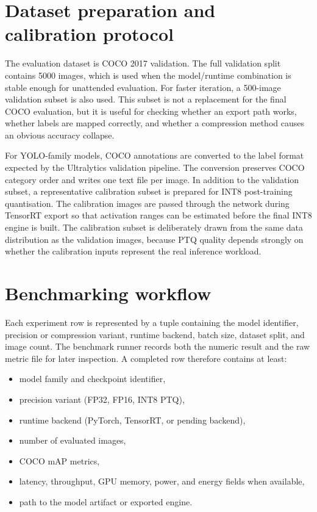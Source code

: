 \documentclass[a4paper,11pt,twoside]{report}
\theoremstyle{definition}
\begin{document}
\section{Dataset preparation and calibration protocol}

The evaluation dataset is COCO 2017 validation. The full validation split contains 5000 images, which is used when the model/runtime combination is stable enough for unattended evaluation. For faster iteration, a 500-image validation subset is also used. This subset is not a replacement for the final COCO evaluation, but it is useful for checking whether an export path works, whether labels are mapped correctly, and whether a compression method causes an obvious accuracy collapse.

For YOLO-family models, COCO annotations are converted to the label format expected by the Ultralytics validation pipeline. The conversion preserves COCO category order and writes one text file per image. In addition to the validation subset, a representative calibration subset is prepared for INT8 post-training quantisation. The calibration images are passed through the network during TensorRT export so that activation ranges can be estimated before the final INT8 engine is built. The calibration subset is deliberately drawn from the same data distribution as the validation images, because PTQ quality depends strongly on whether the calibration inputs represent the real inference workload.

\section{Benchmarking workflow}

Each experiment row is represented by a tuple containing the model identifier, precision or compression variant, runtime backend, batch size, dataset split, and image count. The benchmark runner records both the numeric result and the raw metric file for later inspection. A completed row therefore contains at least:

\begin{itemize}
    \item model family and checkpoint identifier,
    \item precision variant (FP32, FP16, INT8 PTQ),
    \item runtime backend (PyTorch, TensorRT, or pending backend),
    \item number of evaluated images,
    \item COCO mAP metrics,
    \item latency, throughput, GPU memory, power, and energy fields when available,
    \item path to the model artifact or exported engine.
\end{itemize}
\end{document}
